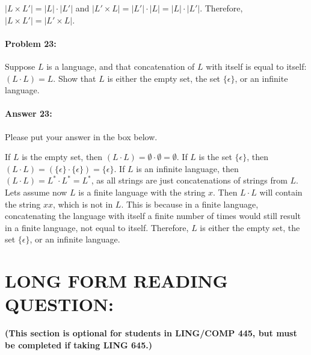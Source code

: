 \documentclass[10pt]{article}
\newenvironment{AnswerBox}{\begin{mdframed}[style=simple]}{\end{mdframed}}
\begin{document}
\begin{AnswerBox}%

  $|L \times L'| = |L| \cdot |L'|$ and $|L' \times L| = |L'| \cdot |L| = |L| \cdot |L'|$. Therefore, $|L \times L'| = |L' \times L|$.

\end{AnswerBox}%

\noindent\hrulefill %

\paragraph{Problem 23:}

Suppose $L$ is a language, and that concatenation of $L$ with itself is equal to
itself: $(L\cdot L) = L$. Show that $L$ is either the empty set,  the set
$\{\epsilon\}$, or an infinite language.

\paragraph{Answer 23:} Please put your answer in the box below.

\begin{AnswerBox}%

  If $L$ is the empty set, then $(L\cdot L) = \emptyset \cdot \emptyset = \emptyset$. If $L$ is the set $\{\epsilon\}$, then $(L\cdot L) = (\{\epsilon\} \cdot \{\epsilon\}) = \{\epsilon\}$. If $L$ is an infinite language, then $(L\cdot L) = L^* \cdot L^* = L^*$, as all strings are just concatenations of strings from $L$. Lets assume now $L$ is a finite language with the string $x$. Then $L \cdot L$ will contain the string $xx$, which is not in $L$. This is because in a finite language, concatenating the language with itself a finite number of times would still result in a finite language, not equal to itself. Therefore, $L$ is either the empty set, the set $\{\epsilon\}$, or an infinite language.
\end{AnswerBox}%


\newpage
\section*{LONG FORM READING QUESTION:} 
\textbf{(This section is optional for students in LING/COMP 445, but must be completed if taking LING 645.)}
\end{document}
